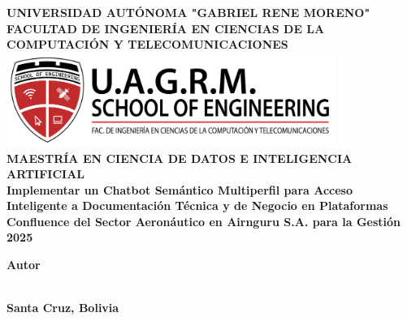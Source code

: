 \begin{titlepage}
    \begin{center}
        {\fontsize{15pt}{10pt}\selectfont\textbf{UNIVERSIDAD AUTÓNOMA "GABRIEL RENE MORENO"}} \\
        {\fontsize{15pt}{10pt}\selectfont\textbf{FACULTAD DE INGENIERÍA EN CIENCIAS DE LA COMPUTACIÓN Y TELECOMUNICACIONES}} \\
        \vspace{1cm}
        \includegraphics[width=0.8\textwidth]{images/logo_soe.png} \\
        
        {\fontsize{15pt}{10pt}\selectfont\textbf{MAESTRÍA EN CIENCIA DE DATOS E INTELIGENCIA ARTIFICIAL}} \\

        \vspace{1cm}
        {\fontsize{15pt}{5pt}\selectfont\textbf{Implementar un Chatbot Semántico Multiperfil para Acceso Inteligente a Documentación Técnica y de Negocio en Plataformas Confluence del Sector Aeronáutico en Airnguru S.A. para la Gestión 2025}} \\
        \vspace{1cm}
        
        \vspace{2cm}
        \begin{flushright}
        {\fontsize{14pt}{22pt}\selectfont\textbf{Autor}} \\
        {\fontsize{14pt}{22pt}\selectfont{Ing. Darlyn Bravo Peña}} \\
        \end{flushright}
        
        
        
        \vfill
        \textbf{Santa Cruz, Bolivia} \\
    \end{center}
    \end{titlepage}
    